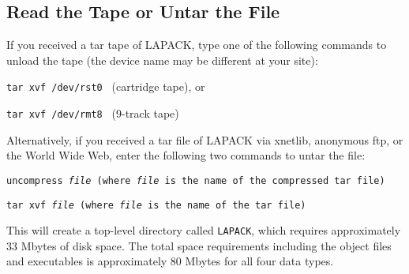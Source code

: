 \begin{enumerate}
%
%
%
\end{enumerate}
 
\subsection{Read the Tape or Untar the File}
\dent
If you received a tar tape of LAPACK, type one of the following commands
to unload the tape
(the device name may be different at your site):

\begin{list}{}{}
\item{{\tt tar  xvf  /dev/rst0 }}    (cartridge tape),  or

\item{{\tt tar  xvf  /dev/rmt8 }}    (9-track tape)
\end{list}

Alternatively, if you received a tar file of LAPACK via xnetlib, anonymous
ftp, or the World Wide Web, enter the following two commands to untar the file:

\begin{list}{}
\item{{\tt uncompress {\em file} (where {\em file} is the name of the
compressed tar file)}}
\item{{\tt tar xvf {\em file} (where {\em file} is the name of the tar
file)}}
\end{list}

\noindent
This will create a top-level directory called {\tt LAPACK}, which
requires approximately 33 Mbytes of disk space.
The total space requirements including the object files and executables
is approximately 80 Mbytes for all four data types.


